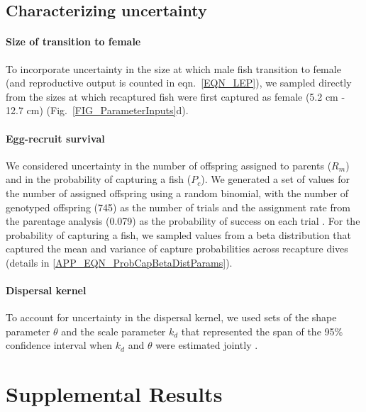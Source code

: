 \documentclass[12pt, oneside]{article}   	%
\begin{document}
\subsection{Characterizing uncertainty} \label{APP_SEC_Uncertainty}

\paragraph{Size of transition to female}

 To incorporate uncertainty in the size at which male fish transition to female (and reproductive output is counted in eqn.\ \ref{EQN_LEP}), we sampled directly from the sizes at which recaptured fish were first captured as female (5.2 cm - 12.7 cm) (Fig.\ \ref{FIG_ParameterInputs}d).

\paragraph{Egg-recruit survival}

We considered uncertainty in the number of offspring assigned to parents ($R_m$) and in the probability of capturing a fish ($P_c$). We generated a set of values for the number of assigned offspring using a random binomial, with the number of genotyped offspring (745) as the number of trials and the assignment rate from the parentage analysis (0.079) as the probability of success on each trial \citep{catalanoInPrepconnectivity}. For the probability of capturing a fish, we sampled values from a beta distribution that captured the mean and variance of capture probabilities across recapture dives (details in \ref{APP_EQN_ProbCapBetaDistParams}).

\paragraph{Dispersal kernel}

To account for uncertainty in the dispersal kernel, we used sets of the shape parameter $\theta$ and the scale parameter $k_d$ that represented the span of the 95\% confidence interval when $k_d$ and $\theta$ were estimated jointly \citep[Table \ref{APP_TAB_Params},][]{catalanoInPrepconnectivity}.

\newpage{}

\section{Supplemental Results}
\end{document}
